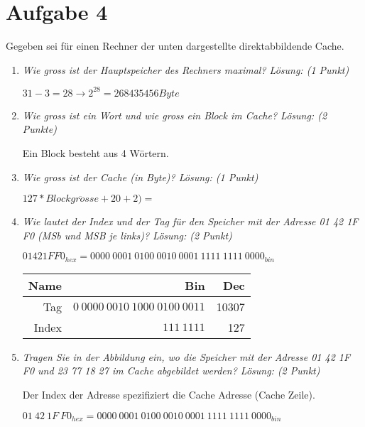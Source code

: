 \documentclass[10pt]{article}
\begin{document}
\section*{Aufgabe 4}
Gegeben sei für einen Rechner der unten dargestellte direktabbildende Cache. 
\begin{enumerate}[label=\alph*)]
	\item
		\textit{Wie gross ist der Hauptspeicher des Rechners maximal? Lösung: (1 Punkt)}
		
		 $31 - 3 = 28 \rightarrow 2^{28} = 268435456 Byte$
	\item
		\textit{Wie gross ist ein Wort und wie gross ein Block im Cache? Lösung: (2 Punkte)}
		
		Ein Block besteht aus 4 Wörtern.
	\item
		\textit{Wie gross ist der Cache (in Byte)? Lösung: (1 Punkt)}
		
		$127 * Blockgr\ddot{o}sse + 20 + 2) = $
		
	\item
		\textit{Wie lautet der Index und der Tag für den Speicher mit der Adresse 01 42 1F F0 (MSb und MSB je links)? Lösung: (2 Punkt)}
		
		$01 42 1F F0_{hex} = 0000\:0001\:0100\:0010\:0001\:1111\:1111\:0000_{bin}$
		
		\begin{tabular}{r | r | r}
			Name & Bin & Dec\\
			\hline
			Tag & $0\:0000\:0010\:1000\:0100\:0011$ & 10307\\
			Index & $111\:1111$ & 127\\
		\end{tabular}
		
	\item
		\textit{Tragen Sie in der Abbildung ein, wo die Speicher mit der Adresse 01 42 1F F0 und 23 77 18 27 im Cache abgebildet werden? Lösung: (2 Punkt)}
		
		Der Index der Adresse spezifiziert die Cache Adresse (Cache Zeile).
		
		$01\:42\:1F\:F0_{hex} = 0000\:0001\:0100\:0010\:0001\:1111\:1111\:0000_{bin}$
		

\end{enumerate}
\end{document}
